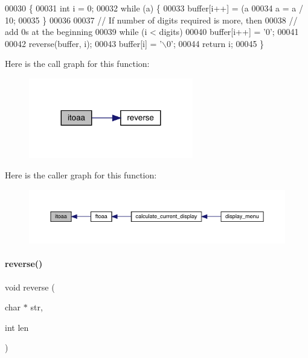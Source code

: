 \begin{DoxyCode}
00030                                            \{
00031   \textcolor{keywordtype}{int} i = 0;
00032   \textcolor{keywordflow}{while} (a) \{
00033     buffer[i++] = (a %
00034     a = a / 10;
00035   \}
00036 
00037   \textcolor{comment}{// If number of digits required is more, then}
00038   \textcolor{comment}{// add 0s at the beginning}
00039   \textcolor{keywordflow}{while} (i < digits)
00040     buffer[i++] = \textcolor{charliteral}{'0'};
00041 
00042   reverse(buffer, i);
00043   buffer[i] = \textcolor{charliteral}{'\(\backslash\)0'};
00044   \textcolor{keywordflow}{return} i;
00045 \}
\end{DoxyCode}
Here is the call graph for this function\+:\nopagebreak
\begin{figure}[H]
\begin{center}
\leavevmode
\includegraphics[width=203pt]{vlib_8c_a28dc918c0df16add26908891a4aa190e_cgraph}
\end{center}
\end{figure}
Here is the caller graph for this function\+:\nopagebreak
\begin{figure}[H]
\begin{center}
\leavevmode
\includegraphics[width=350pt]{vlib_8c_a28dc918c0df16add26908891a4aa190e_icgraph}
\end{center}
\end{figure}
\mbox{\label{vlib_8c_aad7fea725cb4b198ace1aa3df5051244}} 
\paragraph{reverse()}
{\footnotesize\ttfamily void reverse (\begin{DoxyParamCaption}\item[{char $\ast$}]{str,  }\item[{int}]{len }\end{DoxyParamCaption})}



